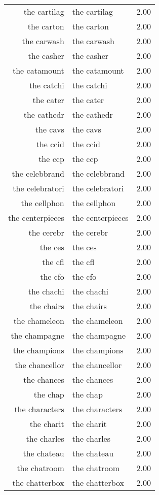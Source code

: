 \begin{table}[ht]
\begin{tabular}{rlr}
  the cartilag & the cartilag & 2.00 \\ 
  the carton & the carton & 2.00 \\ 
  the carwash & the carwash & 2.00 \\ 
  the casher & the casher & 2.00 \\ 
  the catamount & the catamount & 2.00 \\ 
  the catchi & the catchi & 2.00 \\ 
  the cater & the cater & 2.00 \\ 
  the cathedr & the cathedr & 2.00 \\ 
  the cavs & the cavs & 2.00 \\ 
  the ccid & the ccid & 2.00 \\ 
  the ccp & the ccp & 2.00 \\ 
  the celebbrand & the celebbrand & 2.00 \\ 
  the celebratori & the celebratori & 2.00 \\ 
  the cellphon & the cellphon & 2.00 \\ 
  the centerpieces & the centerpieces & 2.00 \\ 
  the cerebr & the cerebr & 2.00 \\ 
  the ces & the ces & 2.00 \\ 
  the cfl & the cfl & 2.00 \\ 
  the cfo & the cfo & 2.00 \\ 
  the chachi & the chachi & 2.00 \\ 
  the chairs & the chairs & 2.00 \\ 
  the chameleon & the chameleon & 2.00 \\ 
  the champagne & the champagne & 2.00 \\ 
  the champions & the champions & 2.00 \\ 
  the chancellor & the chancellor & 2.00 \\ 
  the chances & the chances & 2.00 \\ 
  the chap & the chap & 2.00 \\ 
  the characters & the characters & 2.00 \\ 
  the charit & the charit & 2.00 \\ 
  the charles & the charles & 2.00 \\ 
  the chateau & the chateau & 2.00 \\ 
  the chatroom & the chatroom & 2.00 \\ 
  the chatterbox & the chatterbox & 2.00 \\ 

\end{tabular}
\end{table}
